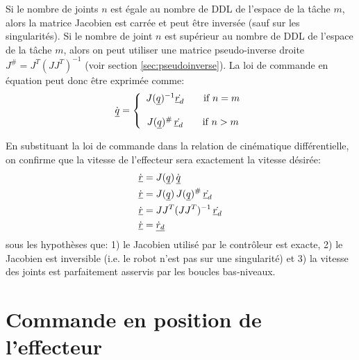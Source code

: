 Si le nombre de joints $n$ est égale au nombre de DDL de l'espace de la tâche $m$, alors la matrice Jacobien est carrée et peut être inversée (sauf sur les singularités). Si le nombre de joint $n$ est supérieur au nombre de DDL de l'espace de la tâche $m$, alors on peut utiliser une matrice pseudo-inverse droite $J^{\#} = J^T (J J^T)^{-1}$ (voir section \ref{sec:pseudoinverse}). La loi de commande en équation peut donc être exprimée comme:
\begin{align}
\dot{\underline{q}} = \left\{ \begin{array}{c}
 J(\underline{q})^{-1} \dot{\underline{r}_d}   \quad\quad \text{if $n=m$}
 \\ \\
 J(\underline{q})^{\#} \, \dot{\underline{r}_d}   \quad\quad \text{if $n>m$}
\end{array}
\right.
\end{align}

En substituant la loi de commande dans la relation de cinématique différentielle, on confirme que la vitesse de l'effecteur sera exactement la vitesse désirée:
\begin{align}
\dot{\underline{r}} &= J(\underline{q}) \, \dot{\underline{q}} \\
\dot{\underline{r}} &= J(\underline{q}) \, J(\underline{q})^{\#} \, \dot{\underline{r}_d} \\
\dot{\underline{r}} &= J J^T (J J^T)^{-1} \, \dot{\underline{r}_d} \\
\dot{\underline{r}} &=  \underline{\dot{r}_d} 
\end{align}
sous les hypothèses que: 1) le Jacobien utilisé par le contrôleur est exacte, 2) le Jacobien est inversible (i.e. le robot n'est pas sur une singularité) et 3) la vitesse des joints est parfaitement asservis par les boucles bas-niveaux. 




\newpage
\section{Commande en position de l'effecteur}
\label{sec:positioncontrol}

